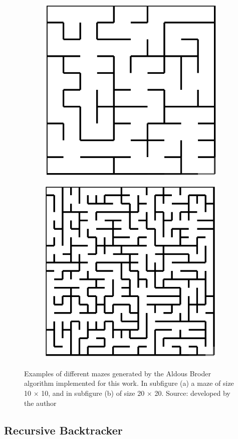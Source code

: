 \newline
\begin{figure}[!h]
	\centering
	\begin{subfigure}{.45\textwidth}
	  \centering
	  \includegraphics[width=.6\linewidth]{aldous1010}
	  \caption{}
	  \label{fig:sub1}
	\end{subfigure}
	\begin{subfigure}{.45\textwidth}
	  \centering
	  \includegraphics[width=.6\linewidth]{aldous2020}
	  \caption{}
	  \label{fig:sub2}
	\end{subfigure}
	\caption{Examples of different mazes generated by the Aldous Broder algorithm implemented for this work. In subfigure (a) a maze of size 10 $\times$ 10, and in subfigure (b) of size 20 $\times$ 20. Source: developed by the author}
	\label{fig:test}
	\end{figure}
\newpage
\subsection{Recursive Backtracker}


